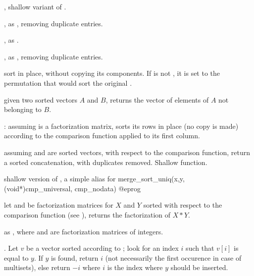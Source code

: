 ,
shallow variant of .

, as
, removing duplicate entries.

,
as .

,
as , removing duplicate entries.

 sort  in place, without copying its components. If
 is not , it is set to the permutation that would sort
the original .

 given two sorted
vectors $A$ and $B$, returns the vector of elements of $A$ not belonging to
$B$.

:
assuming  is a factorization matrix, sorts its rows in place (no copy
is made) according to the comparison function  applied to its first
column.

assuming  and  are sorted vectors, with respect to the 
comparison function, return a sorted concatenation, with duplicates removed.
Shallow function.

 shallow version of , a
simple alias for
\bprog
  merge_sort_uniq(x,y, (void*)cmp_universal, cmp_nodata)
@eprog

let  and  be factorization matrices for $X$ and $Y$
sorted with respect to the comparison function  (see
), returns the factorization of $X * Y$.

as , where  and  are factorization matrices of
integers.

.\hfil\break
Let $v$ be a vector sorted according to ; look for an
index $i$ such that  $v[i]$ is equal to $y$. If $y$ is found, return $i$
(not necessarily the first occurence in case of multisets), else return $-i$
where $i$ is the index where $y$ should be inserted.

